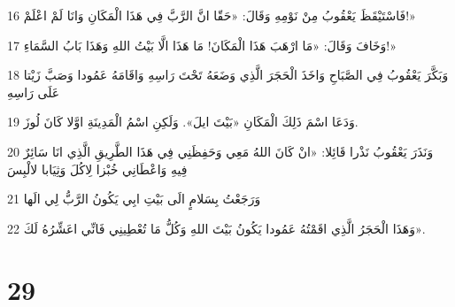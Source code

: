 \par 16 فَاسْتَيْقَظَ يَعْقُوبُ مِنْ نَوْمِهِ وَقَالَ: «حَقّا انَّ الرَّبَّ فِي هَذَا الْمَكَانِ وَانَا لَمْ اعْلَمْ!»
\par 17 وَخَافَ وَقَالَ: «مَا ارْهَبَ هَذَا الْمَكَانَ! مَا هَذَا الَّا بَيْتُ اللهِ وَهَذَا بَابُ السَّمَاءِ!»
\par 18 وَبَكَّرَ يَعْقُوبُ فِي الصَّبَاحِ وَاخَذَ الْحَجَرَ الَّذِي وَضَعَهُ تَحْتَ رَاسِهِ وَاقَامَهُ عَمُودا وَصَبَّ زَيْتا عَلَى رَاسِهِ
\par 19 وَدَعَا اسْمَ ذَلِكَ الْمَكَانِ «بَيْتَ ايلَ». وَلَكِنِ اسْمُ الْمَدِينَةِ اوَّلا كَانَ لُوزَ.
\par 20 وَنَذَرَ يَعْقُوبُ نَذْرا قَائِلا: «انْ كَانَ اللهُ مَعِي وَحَفِظَنِي فِي هَذَا الطَّرِيقِ الَّذِي انَا سَائِرٌ فِيهِ وَاعْطَانِي خُبْزا لِاكُلَ وَثِيَابا لالْبِسَ
\par 21 وَرَجَعْتُ بِسَلامٍ الَى بَيْتِ ابِي يَكُونُ الرَّبُّ لِي الَها
\par 22 وَهَذَا الْحَجَرُ الَّذِي اقَمْتُهُ عَمُودا يَكُونُ بَيْتَ اللهِ وَكُلُّ مَا تُعْطِينِي فَانِّي اعَشِّرُهُ لَكَ».

\chapter{29}

